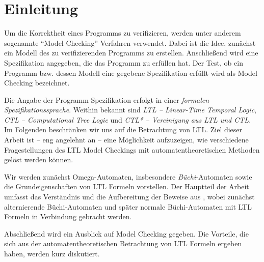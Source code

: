\section{Einleitung}

Um die Korrektheit eines Programms zu verifizieren, werden unter anderem sogenannte "`Model Checking"' Verfahren verwendet. Dabei ist die Idee, zunächst ein Modell des zu verifizierenden Programms zu erstellen. Anschließend wird eine Spezifikation angegeben, die das Programm zu erfüllen hat. Der Test, ob ein Programm bzw. dessen Modell eine gegebene Spezifikation erfüllt wird als Model Checking bezeichnet.

Die Angabe der Programm-Spezifikation erfolgt in einer \textit{formalen Spezifikationssprache}. Weithin bekannt sind \textit{LTL -- Linear-Time Temporal Logic}, \textit{CTL -- Computational Tree Logic} und \textit{CTL* -- Vereinigung aus LTL und CTL}. Im Folgenden beschränken wir uns auf die Betrachtung von LTL. Ziel dieser Arbeit ist -- eng angelehnt an \cite{vardi+96} -- eine Möglichkeit aufzuzeigen, wie verschiedene Fragestellungen des LTL Model Checkings mit automatentheoretischen Methoden gelöst werden können. 

Wir werden zunächst Omega-Automaten, insbesondere \textit{Büchi}-Automaten sowie die Grundeigenschaften von LTL Formeln vorstellen. Der Hauptteil der Arbeit umfasst das Verständnis und die Aufbereitung der Beweise aus \cite{vardi+96}, wobei zunächst alternierende Büchi-Automaten und später normale Büchi-Automaten mit LTL Formeln in Verbindung gebracht werden.

Abschließend wird ein Ausblick auf Model Checking gegeben. Die Vorteile, die sich aus der automatentheoretischen Betrachtung von LTL Formeln ergeben haben, werden kurz diskutiert.